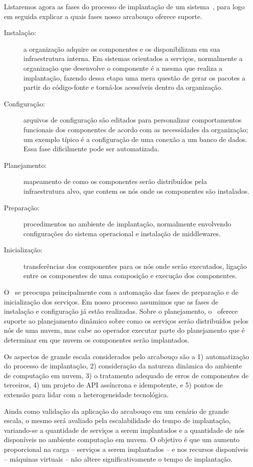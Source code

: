 Listaremos agora as fases do processo de implantação de um sistema~\cite{DEPL2006}, para logo em seguida explicar a quais fases nosso arcabouço oferece suporte.

\begin{description}
\item [Instalação:] a organização adquire os componentes e os disponibilizam em sua infraestrutura interna. Em sistemas orientados a serviços, normalmente a organização que desenvolve o componente é a mesma que realiza a implantação, fazendo dessa etapa uma mera questão de gerar os pacotes a partir do código-fonte e torná-los acessíveis dentro da organização.
\item [Configuração:] arquivos de configuração são editados para personalizar comportamentos funcionais dos componentes de acordo com as necessidades da organização; um exemplo típico é a configuração de uma conexão a um banco de dados. Essa fase dificilmente pode ser automatizada.
\item [Planejamento:] mapeamento de como os componentes serão distribuídos pela infraestrutura alvo, que contem os nós onde os componentes são instalados.
\item [Preparação:] procedimentos no ambiente de implantação, normalmente envolvendo configurações do sistema operacional e instalação de middlewares.
\item [Inicialização:] transferências dos componentes para os nós onde serão executados, ligação entre os componentes de uma composição e execução dos componentes.
\end{description}

O \ee\ se preocupa principalmente com a automação das fases de preparação e de inicialização dos serviços. Em nosso processo assumimos que as fases de instalação e configuração já estão realizadas. Sobre o planejamento, o \ee\ oferece suporte ao planejamento dinâmico sobre como os serviços serão distribuídos pelos nós de uma nuvem, mas cabe ao operador executar parte do planejamento que é determinar em que nuvem os componentes serão implantados.

Os aspectos de grande escala considerados pelo arcabouço são a 1) automatização do processo de implantação, 2) consideração da natureza dinâmica do ambiente de computação em nuvem, 3) o tratamento adequado de erros de componentes de terceiros, 4) um projeto de API assíncrona e idempotente, e 5) pontos de extensão para lidar com a heterogeneidade tecnológica.

Ainda como validação da aplicação do arcabouço em um cenário de grande escala, o mesmo será avaliado pela escalabilidade do tempo de implantação, variando-se a quantidade de serviços a serem implantados e a quantidade de nós disponíveis no ambiente computação em nuvem. O objetivo é que um aumento proporcional na carga -- serviços a serem implantados -- e nos recursos disponíveis -- máquinas virtuais -- não altere significativamente o tempo de implantação.

